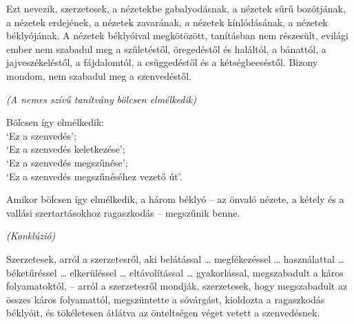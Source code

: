 {Ezt nevezik, szerzetesek, a nézetekbe gabalyodásnak, a nézetek sűrű bozótjának, a nézetek erdejének, a nézetek zavarának, a nézetek kínlódásának, a nézetek béklyójának. A nézetek béklyóival megkötözött, tanításban nem részesült, evilági ember nem szabadul meg a születéstől, öregedéstől és haláltól, a bánattól, a jajveszékeléstől, a fájdalomtól, a csüggedéstől és a kétségbeeséstől. Bizony mondom, nem szabadul meg a szenvedéstől.

\emph{(A nemes szívű tanítvány bölcsen elmélkedik)}

Bölcsen így elmélkedik:\\
`Ez a szenvedés';\\
`Ez a szenvedés keletkezése';\\
`Ez a szenvedés megszűnése';\\
`Ez a szenvedés megszűnéséhez vezető út'.

Amikor bölcsen így elmélkedik, a három béklyó -- az önvaló nézete, a kétely és a
vallási szertartásokhoz ragaszkodás -- megszűnik benne.

\clearpage

\emph{(Konklúzió)}

Szerzetesek, arról a szerzetesről, aki belátással \ldots{} megfékezéssel
\ldots{} használattal \ldots{} béketűréssel \ldots{} elkerüléssel \ldots{}
eltávolítással \ldots{} gyakorlással, megszabadult a káros folyamatoktól, --
arról a szerzetesről mondják, szerzetesek, hogy megszabadult az összes káros
folyamattól, megszüntette a sóvárgást, kioldozta a ragaszkodás béklyóit, és
tökéletesen átlátva az önteltségen véget vetett a szenvedésnek.

}
